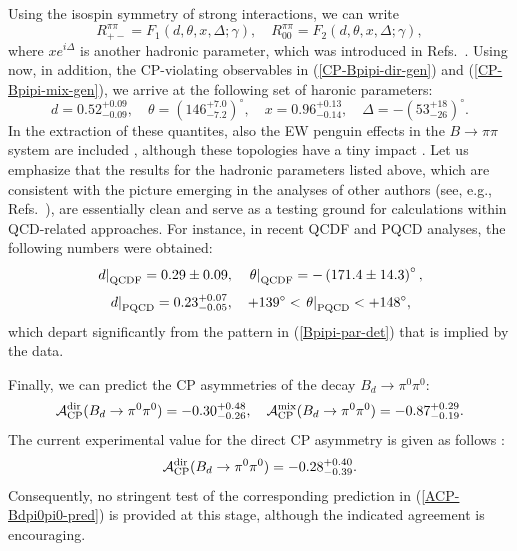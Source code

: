 \documentclass[11pt]{cernrep}
\begin{document}
Using the isospin symmetry of strong interactions, we can write
\begin{equation}\label{Rpipi-gen}
R_{+-}^{\pi\pi}=F_1(d,\theta,x,\Delta;\gamma), \quad
R_{00}^{\pi\pi}=F_2(d,\theta,x,\Delta;\gamma),
\end{equation}
where $xe^{i\Delta}$ is another hadronic parameter, which was introduced
in Refs.~\cite{BFRS2,BFRS3}. Using now, in addition, the CP-violating observables in
(\ref{CP-Bpipi-dir-gen}) and (\ref{CP-Bpipi-mix-gen}), we arrive at the following 
set of haronic parameters:
\begin{equation}\label{Bpipi-par-det}
d=0.52^{+0.09}_{-0.09}, \quad
\theta=(146^{+7.0}_{-7.2})^\circ, \quad
x=0.96^{+0.13}_{-0.14}, \quad
\Delta=-(53^{+18}_{-26})^\circ.
\end{equation}
In the extraction of these quantites, also the EW penguin effects in the 
$B\to\pi\pi$ system are included \cite{BF98,GPY}, although these topologies have a 
tiny impact \cite{PAPIII}. Let us emphasize that the results for the hadronic 
parameters listed above, which are consistent with the picture emerging in the 
analyses of other authors (see, e.g., Refs.~\cite{ALP-Bpipi,CGRS}), 
are essentially clean and serve as a testing ground for 
calculations within QCD-related approaches. For instance, in 
recent QCDF \cite{busa} and PQCD \cite{kesa} analyses, the 
following numbers were obtained:
\begin{equation}
\left.d\right|_{\rm QCDF}=0.29\pm0.09, \quad
\left.\theta\right|_{\rm QCDF}=-\left(171.4\pm14.3\right)^\circ, 
\end{equation}
\begin{equation}
\left.d\right|_{\rm PQCD}=0.23^{+0.07}_{-0.05}, \quad
+139^\circ < \left.\theta\right|_{\rm PQCD} < +148^\circ,
\end{equation}
which depart significantly from the pattern in (\ref{Bpipi-par-det}) that is implied
by the data. 

Finally, we can predict the CP asymmetries of the decay $B_d\to\pi^0\pi^0$:
\begin{equation}\label{ACP-Bdpi0pi0-pred}
{\cal A}_{\rm CP}^{\rm dir}(B_d\to \pi^0\pi^0)=-0.30^{+0.48}_{-0.26}, \quad
{\cal A}_{\rm CP}^{\rm mix}(B_d\to \pi^0\pi^0)=-0.87^{+0.29}_{-0.19}.
\end{equation}
The current experimental value for the direct CP 
asymmetry is given as follows \cite{HFAG}:
\begin{equation}\label{ACP-Bdpi0pi0-exp}
{\cal A}_{\rm CP}^{\rm dir}(B_d\to \pi^0\pi^0)=-0.28^{+0.40}_{-0.39}.
\end{equation}
Consequently, no stringent test of the corresponding prediction 
in (\ref{ACP-Bdpi0pi0-pred}) is provided at this stage, although the 
indicated agreement is encouraging.
\end{document}
